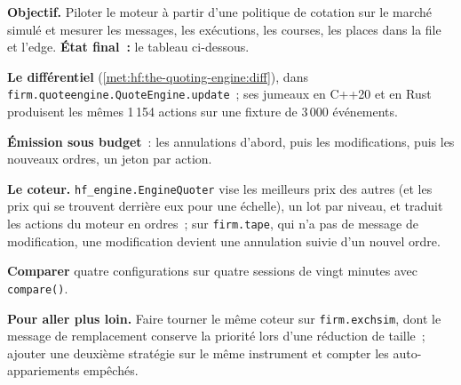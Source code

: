 \begin{tutorial}
\textbf{Objectif.} Piloter le moteur à partir d'une politique de cotation sur le marché simulé et mesurer les messages, les exécutions, les courses, les places dans la file et l'edge.
\textbf{État final~:} le tableau ci-dessous.
\begin{tutsteps}
\item \textbf{Le différentiel} (\cref{met:hf:the-quoting-engine:diff}), dans \texttt{firm.quoteengine.QuoteEngine.update}~; ses jumeaux en C++20 et en Rust produisent les
mêmes 1\,154 actions sur une fixture de 3\,000 événements.
\label{lst:hf:the-quoting-engine:diff}
\item \textbf{Émission sous budget}~: les annulations d'abord, puis les modifications, puis les nouveaux ordres, un jeton par action.
\label{lst:hf:the-quoting-engine:issue}
\item \textbf{Le coteur.} \texttt{hf\_engine.EngineQuoter} vise les meilleurs prix des autres (et les prix qui se trouvent derrière eux pour une échelle), un lot par
niveau, et traduit les actions du moteur en ordres~; sur \texttt{firm.tape}, qui n'a pas de message de modification, une modification devient une annulation suivie d'un
nouvel ordre.
\item \textbf{Comparer} quatre configurations sur quatre sessions de vingt minutes avec \texttt{compare()}.
\end{tutsteps}
\textbf{Pour aller plus loin.} Faire tourner le même coteur sur \texttt{firm.exchsim}, dont le message de remplacement conserve la priorité lors d'une réduction de taille~; ajouter une
deuxième stratégie sur le même instrument et compter les auto-appariements empêchés.
\end{tutorial}


